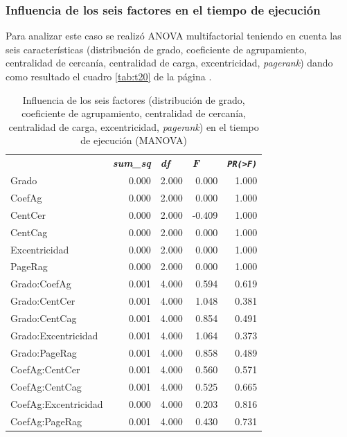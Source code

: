 \documentclass{article}
\begin{document}
\subsubsection{Influencia de los seis factores en el tiempo de ejecución}
Para analizar este caso se realizó ANOVA multifactorial teniendo en cuenta las seis características (distribución de grado, coeficiente de agrupamiento, centralidad de cercanía, centralidad de carga, excentricidad, \textit{pagerank}) dando como resultado el cuadro \ref{tab:t20} de la página \pageref{tab:t20}.

\begin{table}[htbp]
  \centering
  \caption{Influencia de los seis factores (distribución de grado, coeficiente de agrupamiento, centralidad de cercanía, centralidad de carga, excentricidad, \textit{pagerank}) en el tiempo de ejecución (MANOVA)}
    \begin{tabular}{lrrrr}
          & \multicolumn{1}{l}{\textit{\textbf{sum\_sq}}} & \multicolumn{1}{l}{\textit{\textbf{df}}} & \multicolumn{1}{l}{\textit{\textbf{F}}} & \multicolumn{1}{l}{\textit{\textbf{\texttt{PR(>F)}}}} \\
    Grado & 0.000 & 2.000 & 0.000 & 1.000 \\
    CoefAg & 0.000 & 2.000 & 0.000 & 1.000 \\
    CentCer & 0.000 & 2.000 & -0.409 & 1.000 \\
    CentCag & 0.000 & 2.000 & 0.000 & 1.000 \\
    Excentricidad & 0.000 & 2.000 & 0.000 & 1.000 \\
    PageRag & 0.000 & 2.000 & 0.000 & 1.000 \\
    Grado:CoefAg & 0.001 & 4.000 & 0.594 & 0.619 \\
    Grado:CentCer & 0.001 & 4.000 & 1.048 & 0.381 \\
    Grado:CentCag & 0.001 & 4.000 & 0.854 & 0.491 \\
    Grado:Excentricidad & 0.001 & 4.000 & 1.064 & 0.373 \\
    Grado:PageRag & 0.001 & 4.000 & 0.858 & 0.489 \\
    CoefAg:CentCer & 0.001 & 4.000 & 0.560 & 0.571 \\
    CoefAg:CentCag & 0.001 & 4.000 & 0.525 & 0.665 \\
    CoefAg:Excentricidad & 0.000 & 4.000 & 0.203 & 0.816 \\
    CoefAg:PageRag & 0.001 & 4.000 & 0.430 & 0.731 \\

\end{tabular}
\end{table}
\end{document}
